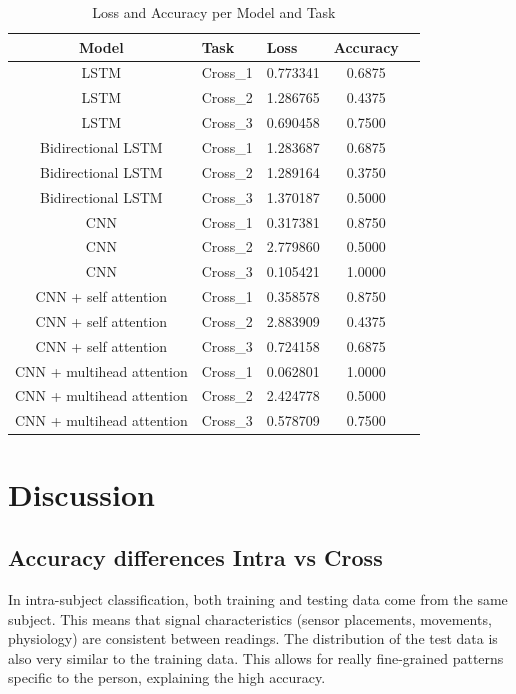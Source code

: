 \documentclass[conference]{IEEEtran}
\begin{document}
\begin{table}[H]
    \centering
    \caption{Loss and Accuracy per Model and Task}
    \begin{tabular}{|c|l|l|c|c|}
    \hline
    \textbf{Model} & \textbf{Task} & \textbf{Loss} & \textbf{Accuracy} \\
    \hline
    LSTM                    & Cross\_1                  & 0.773341  & 0.6875 \\
    LSTM                    & Cross\_2                  & 1.286765  & 0.4375 \\
    LSTM                    & Cross\_3                  & 0.690458  & 0.7500 \\
    Bidirectional LSTM     & Cross\_1                  & 1.283687  & 0.6875 \\
    Bidirectional LSTM     & Cross\_2                  & 1.289164  & 0.3750 \\
    Bidirectional LSTM     & Cross\_3                  & 1.370187  & 0.5000 \\
    CNN                    & Cross\_1                  & 0.317381  & 0.8750 \\
    CNN                    & Cross\_2                  & 2.779860  & 0.5000 \\
    CNN                    & Cross\_3                  & 0.105421  & 1.0000 \\
    CNN + self attention   & Cross\_1                  & 0.358578  & 0.8750 \\
    CNN + self attention   & Cross\_2                  & 2.883909  & 0.4375 \\
    CNN + self attention   & Cross\_3                  & 0.724158  & 0.6875 \\
    CNN + multihead attention & Cross\_1              & 0.062801  & 1.0000 \\
    CNN + multihead attention & Cross\_2              & 2.424778  & 0.5000 \\
    CNN + multihead attention & Cross\_3              & 0.578709  & 0.7500 \\
    \hline
    \end{tabular}
    \label{tab:cross_model_results}
    \end{table}
    

\section{Discussion}

\subsection{Accuracy differences Intra vs Cross}
In intra-subject classification, both training and testing data come from the same subject. This means that signal characteristics (sensor placements, movements, physiology) are consistent between readings. The distribution of the test data is also very similar to the training data. This allows for really fine-grained patterns specific to the person, explaining the high accuracy. 
\end{document}
